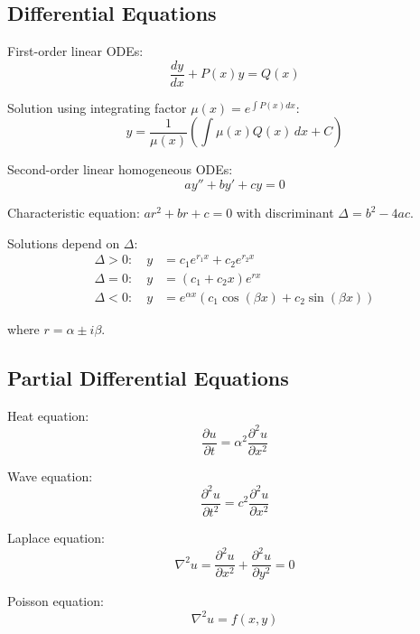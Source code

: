 \documentclass[12pt]{article}
\begin{document}
\subsection{Differential Equations}

First-order linear ODEs:
\begin{equation}
\frac{dy}{dx} + P(x)y = Q(x)
\end{equation}

Solution using integrating factor $\mu(x) = e^{\int P(x) dx}$:
\begin{equation}
y = \frac{1}{\mu(x)} \left( \int \mu(x) Q(x) \, dx + C \right)
\end{equation}

Second-order linear homogeneous ODEs:
\begin{equation}
ay'' + by' + cy = 0
\end{equation}

Characteristic equation: $ar^2 + br + c = 0$ with discriminant $\Delta = b^2 - 4ac$.

Solutions depend on $\Delta$:
\begin{align}
\Delta > 0: \quad y &= c_1 e^{r_1 x} + c_2 e^{r_2 x} \\
\Delta = 0: \quad y &= (c_1 + c_2 x) e^{rx} \\
\Delta < 0: \quad y &= e^{\alpha x}(c_1 \cos(\beta x) + c_2 \sin(\beta x))
\end{align}

where $r = \alpha \pm i\beta$.

\subsection{Partial Differential Equations}

Heat equation:
\begin{equation}
\frac{\partial u}{\partial t} = \alpha^2 \frac{\partial^2 u}{\partial x^2}
\end{equation}

Wave equation:
\begin{equation}
\frac{\partial^2 u}{\partial t^2} = c^2 \frac{\partial^2 u}{\partial x^2}
\end{equation}

Laplace equation:
\begin{equation}
\nabla^2 u = \frac{\partial^2 u}{\partial x^2} + \frac{\partial^2 u}{\partial y^2} = 0
\end{equation}

Poisson equation:
\begin{equation}
\nabla^2 u = f(x,y)
\end{equation}
\end{document}
